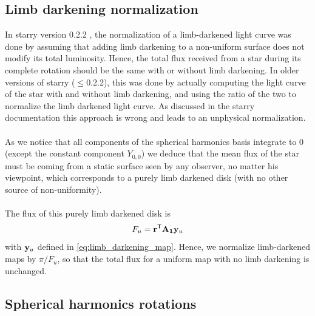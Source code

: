 \documentclass[modern]{aastex631}
\begin{document}
\subsection{Limb darkening normalization}
In \textsf{starry} version 0.2.2 \citep{starry}, the normalization of a limb-darkened light curve was done by assuming that adding limb darkening to a non-uniform surface does not modify its total luminosity. Hence, the total flux received from a star during its complete rotation should be the same with or without limb darkening. In older versions of starry ($\le$0.2.2), this was done by actually computing the light curve of the star with and without limb darkening, and using the ratio of the two to normalize the limb darkened light curve. As discussed in the \textsf{starry} documentation this approach is wrong and leads to an unphysical normalization.\\\\
As we notice that all components of the spherical harmonics basis integrate to 0 (except the constant component $Y_{0,0}$) we deduce that the mean flux of the star must be coming from a static surface seen by any observer, no matter his viewpoint, which corresponds to a purely limb darkened disk (with no other source of non-uniformity).\\\\
The flux of this purely limb darkened disk is
\begin{equation}
    \label{eq:fu}
    F_u = \bvec{r}^\mathsf{T}\bvec{A_1}\bvec{y}_u
\end{equation}
with ${\mathbf{y}}_u$ defined in \autoref{eq:limb_darkening_map}. Hence, we normalize limb-darkened maps by $\pi/F_u$, so that the total flux for a uniform map with no limb darkening is unchanged.


\subsection{Spherical harmonics rotations}

\end{document}
